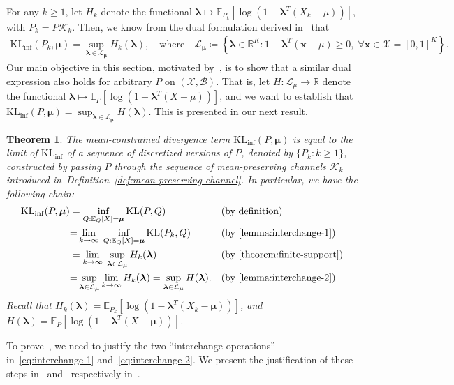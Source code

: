 \documentclass{article}
\theoremstyle{plain}
\newtheorem{theorem}{Theorem}[section]
\theoremstyle{definition}
\newcommand{\lrset}[1]{\left\{ #1 \right\}}
\newcommand{\KLinf}{\operatorname{KL_{inf}}}
\newcommand{\KL}{\operatorname{KL}}
\newcommand{\R}{\mathbb{R}}
\newcommand{\calX}{\mathcal X}
\newcommand{\calB}{\mathcal B}
\newcommand{\calL}{\mathcal L}
\newcommand{\calK}{\mathcal{K}}
\newcommand{\xvec}{\mathbf{x}}
\newcommand{\qtext}[1]{\quad \text{#1} \quad}
\newcommand{\boldlambda}{\boldsymbol{\lambda}}
\newcommand{\boldmu}{\boldsymbol{\mu}}
\begin{document}
    For any $k \geq 1$, let $H_k$ denote the functional $\boldlambda \mapsto \mathbb{E}_{P_k}[ \log (1 - \boldlambda^T(X_k-\mu))]$,  with $P_k = P \calK_k$.  Then, we know from the dual formulation derived in~ that 
    \begin{align}
        \KLinf(P_k, \boldmu) = \sup_{\boldlambda \in \calL_{\boldmu}} H_k(\boldlambda), \qtext{where} \calL_{\boldmu} \coloneqq \lrset{\boldlambda \in \R^K: 1 - \boldlambda^T(\xvec-\mu) \geq 0, \; \forall \xvec \in \calX = [0,1]^K}.
    \end{align}
    Our main objective in this section, motivated by~, is to show that a similar dual expression also holds for arbitrary $P$ on $(\calX, \calB)$. That is,  let $H:\calL_\mu \to \R$ denote the functional $\boldlambda \mapsto \mathbb{E}_{P}[ \log (1 - \boldlambda^T(X-\mu))]$, and we want to establish that $\KLinf(P, \boldmu) = \sup_{\boldlambda \in \calL_{\boldmu}} H(\boldlambda)$. This is presented in our next result. 
\begin{theorem}
    \label{theorem:continuous-klinf} The mean-constrained divergence term $\KLinf(P, \boldmu)$ is equal to the limit of $\KLinf$ of a sequence of discretized versions of $P$, denoted by $\{P_k: k \geq 1\}$, constructed by passing $P$ through the sequence of mean-preserving channels $\calK_k$ introduced in~Definition~\ref{def:mean-preserving-channel}. In particular, we have the following chain: 
\begin{align}
    \KLinf(P, \boldmu) &= \inf_{Q: \mathbb{E}_Q[X]=\boldmu} \KL(P, Q) && \text{(by definition})\nonumber \\
   & {=} \lim_{k \to \infty}\;\inf_{Q: \mathbb{E}_{Q}[X]=\boldmu}  \KL(P_k, Q) && (\text{by~\Cref{lemma:interchange-1}}) \label{eq:interchange-1}\\
   &= \lim_{k \to \infty}\;\sup_{\boldlambda \in \calL_{\boldmu}} H_k(\boldlambda) && (\text{by~\Cref{theorem:finite-support}})  \nonumber \\ 
   & {=} \sup_{\boldlambda \in \calL_{\boldmu}} \lim_{k \to \infty} H_k(\boldlambda) = \sup_{\boldlambda \in \calL_{\boldmu}} H(\boldlambda). && (\text{by~\Cref{lemma:interchange-2}}) \label{eq:interchange-2}
\end{align}
Recall that $H_k(\boldlambda) = \mathbb{E}_{P_k}[\log(1-\boldlambda^T(X_k-\boldmu))]$, and $H(\boldlambda) = \mathbb{E}_{P}[\log(1-\boldlambda^T(X-\boldmu))]$. 
\end{theorem}
To prove~, we need to justify the two ``interchange operations'' in~\eqref{eq:interchange-1} and~\eqref{eq:interchange-2}. We present the justification of these steps in~ and~ respectively in~.  
\end{document}
